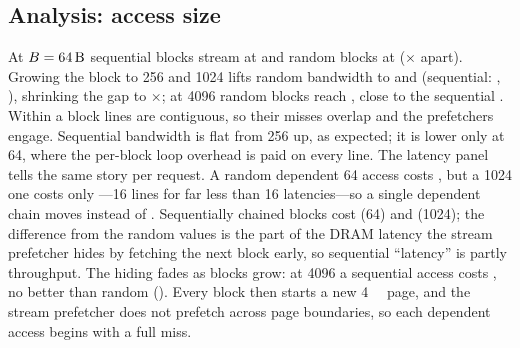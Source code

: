 \subsection{Analysis: access size}
At $B=\qty{64}{\byte}$ sequential blocks stream at  and
random blocks at  ($\times$ apart).
Growing the block to \qty{256}{\byte} and \qty{1024}{\byte} lifts random bandwidth to
 and 
(sequential: , ),
shrinking the gap to $\times$; at \qty{4096}{\byte} random blocks reach
, close to the sequential .
Within a block lines are contiguous, so their misses overlap and the prefetchers engage. Sequential
bandwidth is flat from \qty{256}{\byte} up, as expected; it is lower only at \qty{64}{\byte}, where the
per-block loop overhead is paid on every line. The latency panel tells the same story per request. A random
dependent \qty{64}{\byte} access costs , but a
\qty{1024}{\byte} one costs only ---16 lines for far less
than 16 latencies---so a single dependent chain moves 
instead of . Sequentially chained blocks cost  (\qty{64}{\byte}) and
 (\qty{1024}{\byte}); the difference from the random values is
the part of the DRAM latency the stream prefetcher hides by fetching the next block early, so sequential
``latency'' is partly throughput. The hiding fades as blocks grow: at \qty{4096}{\byte} a sequential access
costs , no better than random ().
Every block then starts a new \qty{4}{\kibi\byte} page, and the stream prefetcher does not prefetch across
page boundaries, so each dependent access begins with a full miss.

